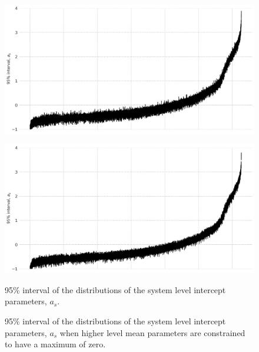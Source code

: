 \documentclass[a4paper]{article}
\begin{document}

\begin{figure}
\begin{minipage}{.45\textwidth}
  \centering
  \includegraphics[width=1\linewidth]{figures/Bay_as.png}
  \label{sfig:Bay_as}
 \end{minipage}\qquad
\begin{minipage}{.45\textwidth}
  \centering
  \includegraphics[width=1\linewidth]{figures/Bay_as_const.png}
  \label{sfig:Bay_as_const}
 \end{minipage}

\bigskip

\begin{minipage}[t]{.45\textwidth}
\centering
  \caption{95\% interval of the distributions of the system level intercept parameters, $a_s$.}
\end{minipage}\qquad
\begin{minipage}[t]{.45\textwidth}
\centering
  \caption{95\% interval of the distributions of the system level intercept parameters, $a_s$ when higher level mean parameters are constrained to have a maximum of zero.}
\end{minipage}
\end{figure}
\end{document}
